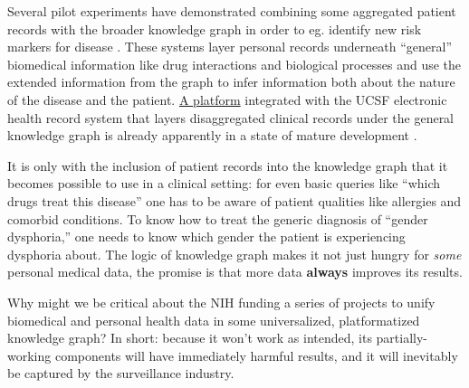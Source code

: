 \documentclass{article}
\begin{document}
Several pilot experiments have demonstrated combining some aggregated
patient records with the broader knowledge graph in order to eg.
identify new risk markers for disease \cite{morrisScalablePrecisionMedicine2023, nelsonEmbeddingElectronicHealth2021, translatorconsortiumClinicalDataServices2020, nelsonIntegratingBiomedicalResearch2019} . These systems layer
personal records underneath ``general'' biomedical information like drug
interactions and biological processes and use the extended information
from the graph to infer information both about the nature of the disease
and the patient. \href{https://www.matebioservices.com/bridge}{A
platform} integrated with the UCSF electronic health record system that
layers disaggregated clinical records under the general knowledge graph
is already apparently in a state of mature development \cite{universityofcaliforniasanfranciscoBRIDGE} .

It is only with the inclusion of patient records into the knowledge
graph that it becomes possible to use in a clinical setting: for even
basic queries like ``which drugs treat this disease'' one has to be
aware of patient qualities like allergies and comorbid conditions. To
know how to treat the generic diagnosis of ``gender dysphoria,'' one
needs to know which gender the patient is experiencing dysphoria about.
The logic of knowledge graph makes it not just hungry for \emph{some}
personal medical data, the promise is that more data \textbf{always}
improves its results.

Why might we be critical about the NIH funding a series of projects to
unify biomedical and personal health data in some universalized,
platformatized knowledge graph? In short: because it won't work as
intended, its partially-working components will have immediately harmful
results, and it will inevitably be captured by the surveillance
industry.
\end{document}
